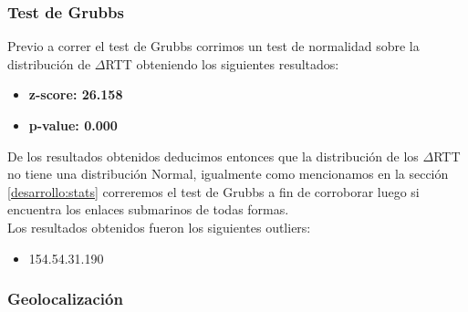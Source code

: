 \subsubsection{Test de Grubbs}\label{malaga:grubbs}

Previo a correr el test de Grubbs corrimos un test de normalidad sobre la distribución de $\Delta$RTT obteniendo los siguientes resultados:

\begin{itemize}
\item \textbf{z-score: 26.158}
\item \textbf{p-value: 0.000}
\end{itemize}

De los resultados obtenidos deducimos entonces que la distribución de los $\Delta$RTT no tiene una distribución Normal, igualmente como mencionamos en la sección \ref{desarrollo:stats} correremos el test de Grubbs a fin de corroborar luego si encuentra los enlaces submarinos de todas formas.\\
Los resultados obtenidos fueron los siguientes outliers:

\begin{itemize}
\item 154.54.31.190
\end{itemize}


\subsubsection{Geolocalización}

